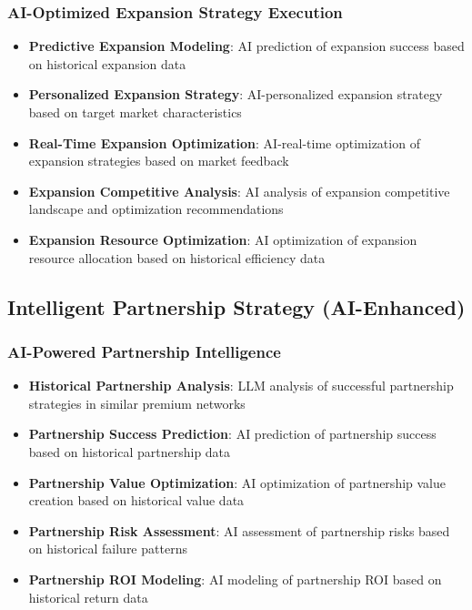 \subsubsection{AI-Optimized Expansion Strategy Execution}

\begin{itemize}
    \item \textbf{Predictive Expansion Modeling}: AI prediction of expansion success based on historical expansion data
    \item \textbf{Personalized Expansion Strategy}: AI-personalized expansion strategy based on target market characteristics
    \item \textbf{Real-Time Expansion Optimization}: AI-real-time optimization of expansion strategies based on market feedback
    \item \textbf{Expansion Competitive Analysis}: AI analysis of expansion competitive landscape and optimization recommendations
    \item \textbf{Expansion Resource Optimization}: AI optimization of expansion resource allocation based on historical efficiency data
\end{itemize}

\subsection{Intelligent Partnership Strategy (AI-Enhanced)}

\subsubsection{AI-Powered Partnership Intelligence}

\begin{itemize}
    \item \textbf{Historical Partnership Analysis}: LLM analysis of successful partnership strategies in similar premium networks
    \item \textbf{Partnership Success Prediction}: AI prediction of partnership success based on historical partnership data
    \item \textbf{Partnership Value Optimization}: AI optimization of partnership value creation based on historical value data
    \item \textbf{Partnership Risk Assessment}: AI assessment of partnership risks based on historical failure patterns
    \item \textbf{Partnership ROI Modeling}: AI modeling of partnership ROI based on historical return data
\end{itemize}


